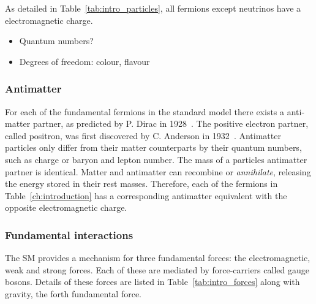 As detailed in Table~\ref{tab:intro_particles}, all fermions except neutrinos have a electromagnetic charge. 


{\color{Red}
\begin{itemize}
\item Quantum numbers?
\item Degrees of freedom: colour, flavour
\end{itemize}}


\subsubsection{Antimatter}

For each of the fundamental fermions in the standard model there exists a anti-matter partner, as predicted by P. Dirac in 1928~\cite{Dirac610}. The positive electron partner, called positron, was first discovered by C. Anderson in 1932~\cite{PhysRev.43.491}.
Antimatter particles only differ from their matter counterparts by their quantum numbers, such as charge or baryon and lepton number. The mass of a particles antimatter partner is identical. Matter and antimatter can recombine or \emph{annihilate}, releasing the energy stored in their rest masses. 
Therefore, each of the fermions in Table~\ref{ch:introduction} has a corresponding antimatter equivalent with the opposite electromagnetic charge.  

\subsubsection{Fundamental interactions}

The SM provides a mechanism for three fundamental forces: the electromagnetic, weak and strong forces. Each of these are mediated by force-carriers called gauge bosons.
Details of these forces are listed in Table~\ref{tab:intro_forces} along with gravity, the forth fundamental force. 

